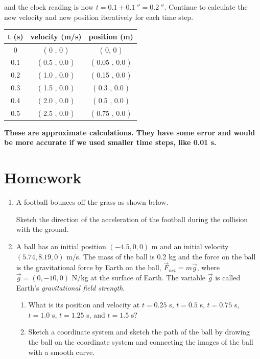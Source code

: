 {and the clock reading is now $t=0.1+0.1\ \second=0.2\ \second$. Continue to calculate the new velocity and new position iteratively for each time step.

\begin{center}
\begin{tabular}{|c|c|c|}
\hline
 t (s) & velocity (m/s) & position (m) \\
\hline
\hline 
  0  & ( 0 , 0 ) & ( 0, 0 )  \\
\hline 
  0.1  & ( 0.5 , 0.0 )  & ( 0.05 , 0.0 )  \\
\hline 
  0.2  & ( 1.0 , 0.0 )  & ( 0.15 , 0.0 )  \\
\hline 
  0.3  & ( 1.5 , 0.0 )  & ( 0.3 , 0.0 )  \\
\hline 
  0.4  & ( 2.0 , 0.0 )  & ( 0.5 , 0.0 )  \\
\hline 
  0.5  & ( 2.5 , 0.0 )  & ( 0.75 , 0.0 )  \\
\hline 
\hline
\end{tabular}
\end{center}

{\bf These are approximate calculations. They have some error and would be more accurate if we used smaller time steps, like 0.01 s.}

}

\pagebreak

\section*{Homework}

\begin{enumerate}
	\item A football bounces off the grass as shown below. 
	

Sketch the direction of the acceleration of the football during the collision with the ground.

	\item A ball has an initial position $(-4.5, 0, 0)$ m and an initial velocity $(5.74, 8.19, 0)$ m/s. The mass of the ball is 0.2 kg and the force on the ball is the gravitational force by Earth on the ball, $\vec{F}_{net}=m\vec{g}$, where $\vec{g}=(0,-10,0)$ N/kg at the surface of Earth. The variable $\vec{g}$ is called Earth's \emph{gravitational field strength}.
	\begin{enumerate}
		\item  What is its position and velocity at $t=0.25$ s, $t=0.5$ s, $t=0.75$ s, $t=1.0$ s, $t=1.25$ s, and $t=1.5$ s?
		\item Sketch a coordinate system and sketch the path of the ball by drawing the ball on the coordinate system and connecting the images of the ball with a smooth curve.
	\end{enumerate}

	
\end{enumerate}
